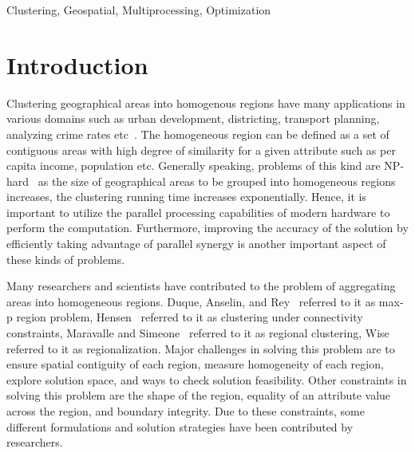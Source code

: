 \documentclass[conference]{IEEEtran}
\begin{document}
\begin{IEEEkeywords}
Clustering, Geospatial, Multiprocessing, Optimization
\end{IEEEkeywords}

\section{Introduction}
Clustering geographical areas into homogenous regions have many applications in
various domains such as urban development, districting, transport planning,
analyzing crime rates etc~\cite{r26}. The homogeneous region can be defined as a set
of contiguous areas with high degree of similarity for a given attribute such as
per capita income, population etc. Generally speaking, problems of this kind are
 NP-hard~\cite{r1} as the size of geographical areas to be
grouped into homogeneous regions increases, the clustering running time
increases exponentially. Hence, it is important to utilize the parallel
processing capabilities of modern hardware to perform the computation. Furthermore, improving the accuracy of the solution by efficiently taking advantage of parallel synergy is another important aspect of these kinds of problems.

Many researchers and scientists have contributed to the problem of aggregating
areas into homogeneous regions. Duque, Anselin, and Rey~\cite{r1} referred to it
as max-p region problem, Hensen~\cite{r2} referred to it as clustering under
connectivity constraints, Maravalle and Simeone~\cite{r3} referred to it as
regional clustering, Wise~\cite{r25} referred to it as regionalization. Major
challenges in solving this problem are to ensure spatial contiguity of each
region, measure homogeneity of each region, explore solution space, and ways to
check solution feasibility. Other constraints in solving this problem are the shape
of the region, equality of an attribute value across the region, and boundary
integrity. Due to these constraints, some different formulations and
solution strategies have been contributed by researchers.
\end{document}
